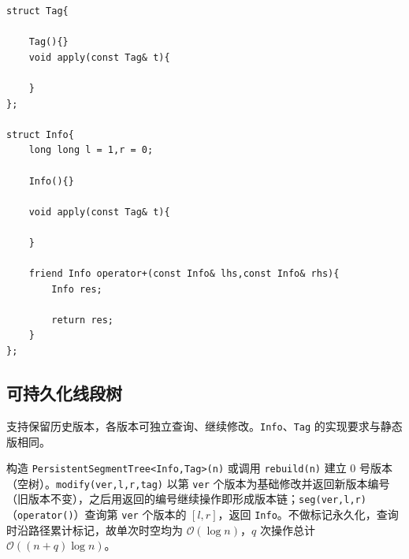 \begin{lstlisting}
struct Tag{
    
    Tag(){}
    void apply(const Tag& t){
        
    }
};

struct Info{
    long long l = 1,r = 0;
    
    Info(){}
    
    void apply(const Tag& t){
        
    }
    
    friend Info operator+(const Info& lhs,const Info& rhs){
        Info res;
        
        return res;
    }
};
\end{lstlisting}

\subsection{可持久化线段树}

支持保留历史版本，各版本可独立查询、继续修改。\texttt{Info}、\texttt{Tag} 的实现要求与静态版相同。

构造 \texttt{PersistentSegmentTree<Info,Tag>(n)} 或调用 \texttt{rebuild(n)} 建立 $0$ 号版本（空树）。\texttt{modify(ver,l,r,tag)} 以第 \texttt{ver} 个版本为基础修改并返回新版本编号（旧版本不变），之后用返回的编号继续操作即形成版本链；\texttt{seg(ver,l,r)}（\texttt{operator()}）查询第 \texttt{ver} 个版本的 $[l,r]$，返回 \texttt{Info}。不做标记永久化，查询时沿路径累计标记，故单次时空均为 $\mathcal{O}(\log n)$，$q$ 次操作总计 $\mathcal{O}((n+q)\log n)$。

